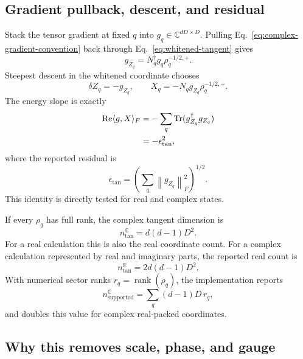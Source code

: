 \documentclass[11pt]{article}
\newcommand{\CC}{\mathbb{C}}
\newcommand{\R}{\mathbb{R}}
\newcommand{\Tr}{\operatorname{Tr}}
\newcommand{\rank}{\operatorname{rank}}
\newcommand{\RePart}{\operatorname{Re}}
\newcommand{\norm}[1]{\left\lVert #1\right\rVert}
\begin{document}
\subsection{Gradient pullback, descent, and residual}

Stack the tensor gradient at fixed $q$ into $g_q\in\CC^{dD\times D}$.  Pulling
Eq.~\eqref{eq:complex-gradient-convention} back through
Eq.~\eqref{eq:whitened-tangent} gives
\begin{equation}
  g_{Z_q}=N_q^\dagger g_q\rho_q^{-1/2,+}.
  \label{eq:reduced-gradient}
\end{equation}
Steepest descent in the whitened coordinate chooses
\begin{equation}
  \delta Z_q=-g_{Z_q},
  \qquad
  X_q=-N_qg_{Z_q}\rho_q^{-1/2,+}.
  \label{eq:conditional-descent}
\end{equation}
The energy slope is exactly
\begin{align}
  \RePart\langle g,X\rangle_F
  &= -\sum_q\Tr(g_{Z_q}^\dagger g_{Z_q})
  \notag\\
  &=-\epsilon_{\mathrm{tan}}^2,
  \label{eq:slope-residual}
\end{align}
where the reported residual is
\begin{equation}
  \epsilon_{\mathrm{tan}}
  =\left(\sum_q\norm{g_{Z_q}}_F^2\right)^{1/2}.
  \label{eq:tangent-residual}
\end{equation}
This identity is directly tested for real and complex states.

If every $\rho_q$ has full rank, the complex tangent dimension is
\begin{equation}
  n_{\mathrm{tan}}^{\CC}=d(d-1)D^2.
  \label{eq:full-complex-tangent-dim}
\end{equation}
For a real calculation this is also the real coordinate count.  For a complex
calculation represented by real and imaginary parts, the reported real count is
\begin{equation}
  n_{\mathrm{tan}}^{\R}=2d(d-1)D^2.
  \label{eq:full-real-tangent-dim}
\end{equation}
With numerical sector ranks $r_q=\rank(\rho_q)$, the implementation reports
\begin{equation}
  n_{\mathrm{supported}}^{\CC}
  =\sum_q(d-1)D\,r_q,
  \label{eq:supported-tangent-dim}
\end{equation}
and doubles this value for complex real-packed coordinates.

\subsection{Why this removes scale, phase, and gauge}
\end{document}
